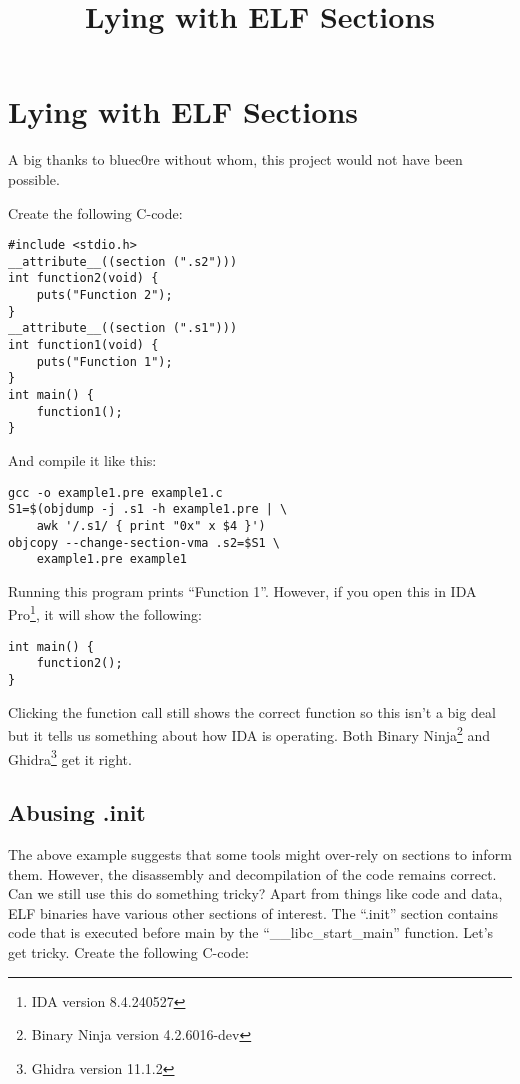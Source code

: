 \documentclass[twocolumn]{article}
\begin{document}
\title{Lying with ELF Sections}
\date{}

\section*{Lying with ELF Sections}
\vspace*{-0.5\baselineskip}

A big thanks to bluec0re without whom, this project would not have been possible. 

Create the following C-code:

\begin{verbatim}
#include <stdio.h>
__attribute__((section (".s2")))
int function2(void) {
    puts("Function 2");
}
__attribute__((section (".s1")))
int function1(void) {
    puts("Function 1");
}
int main() {
    function1();
}
\end{verbatim}

And compile it like this:

\begin{verbatim}
gcc -o example1.pre example1.c 
S1=$(objdump -j .s1 -h example1.pre | \
    awk '/.s1/ { print "0x" x $4 }')
objcopy --change-section-vma .s2=$S1 \
    example1.pre example1
\end{verbatim}

Running this program prints ``Function 1''. However, if you open this in IDA Pro\footnote{IDA version 8.4.240527}, it will show the following:

\begin{verbatim}
int main() {
    function2();
}
\end{verbatim}

Clicking the function call still shows the correct function so this isn't a big deal but it tells us something about how IDA is operating. Both Binary Ninja\footnote{Binary Ninja version 4.2.6016-dev} and Ghidra\footnote{Ghidra version 11.1.2} get it right.

\vspace*{-0.5\baselineskip}
\subsection*{Abusing .init}

The above example suggests that some tools might over-rely on sections to inform them. However, the disassembly and decompilation of the code remains correct. Can we still use this do something tricky? Apart from things like code and data, ELF binaries have various other sections of interest. The ``.init'' section contains code that is executed before main by the ``\_\_libc\_start\_main'' function. Let's get tricky. Create the following C-code:
\end{document}

